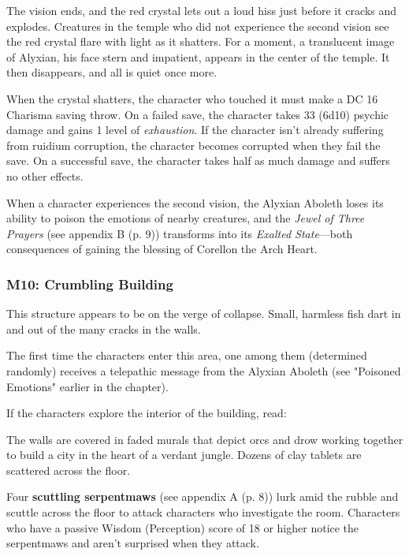 \documentclass[a4paper, 11pt, bg=full, twocolumn, nooutline]{dndbook}
\begin{document}
The vision ends, and the red crystal lets out a loud hiss just before it cracks and explodes. Creatures in the temple who did not experience the second vision see the red crystal flare with light as it shatters. For a moment, a translucent image of Alyxian, his face stern and impatient, appears in the center of the temple. It then disappears, and all is quiet once more.

When the crystal shatters, the character who touched it must make a DC 16 Charisma saving throw. On a failed save, the character takes 33 (6d10) psychic damage and gains 1 level of \textit{exhaustion}. If the character isn't already suffering from ruidium corruption, the character becomes corrupted when they fail the save. On a successful save, the character takes half as much damage and suffers no other effects.

When a character experiences the second vision, the Alyxian Aboleth loses its ability to poison the emotions of nearby creatures, and the \textit{Jewel of Three Prayers} (see appendix B (p. 9)) transforms into its \textit{Exalted State}---both consequences of gaining the blessing of Corellon the Arch Heart.

\subsubsection{M10: Crumbling Building}

This structure appears to be on the verge of collapse. Small, harmless fish dart in and out of the many cracks in the walls.

The first time the characters enter this area, one among them (determined randomly) receives a telepathic message from the Alyxian Aboleth (see "Poisoned Emotions" earlier in the chapter).

If the characters explore the interior of the building, read:

\begin{DndReadAloud}
The walls are covered in faded murals that depict orcs and drow working together to build a city in the heart of a verdant jungle. Dozens of clay tablets are scattered across the floor.
\end{DndReadAloud}

Four \textbf{scuttling serpentmaws} (see appendix A (p. 8)) lurk amid the rubble and scuttle across the floor to attack characters who investigate the room. Characters who have a passive Wisdom (Perception) score of 18 or higher notice the serpentmaws and aren't surprised when they attack.
\end{document}
